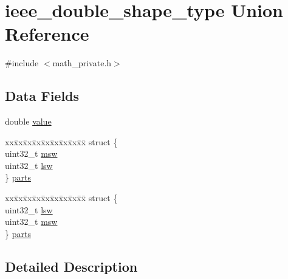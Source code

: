\hypertarget{unionieee__double__shape__type}{\section{ieee\-\_\-double\-\_\-shape\-\_\-type Union Reference}
\label{unionieee__double__shape__type}
}


{\ttfamily \#include $<$math\-\_\-private.\-h$>$}

\subsection*{Data Fields}
\begin{DoxyCompactItemize}
\item 
double \hyperlink{unionieee__double__shape__type_a2d9c4cab9e3fa74e4be6d72f798a145b}{value}
\item 
\begin{tabbing}
xx\=xx\=xx\=xx\=xx\=xx\=xx\=xx\=xx\=\kill
struct \{\\
\>uint32\_t \hyperlink{unionieee__double__shape__type_a887ac49e741cafa9c74aa397a6fa04a5}{msw}\\
\>uint32\_t \hyperlink{unionieee__double__shape__type_a31323ff275e4b9f21d1f0dac6ed02a97}{lsw}\\
\} \hyperlink{unionieee__double__shape__type_a56d56a067ef071ada93836397ea0050a}{parts}\\

\end{tabbing}\item 
\begin{tabbing}
xx\=xx\=xx\=xx\=xx\=xx\=xx\=xx\=xx\=\kill
struct \{\\
\>uint32\_t \hyperlink{unionieee__double__shape__type_a31323ff275e4b9f21d1f0dac6ed02a97}{lsw}\\
\>uint32\_t \hyperlink{unionieee__double__shape__type_a887ac49e741cafa9c74aa397a6fa04a5}{msw}\\
\} \hyperlink{unionieee__double__shape__type_a14b6183c096c0f76d6596e3c737d3c9b}{parts}\\

\end{tabbing}\end{DoxyCompactItemize}


\subsection{Detailed Description}


